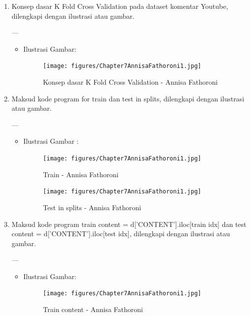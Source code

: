 {\begin{enumerate}
\begin{itemize}
\end{itemize}

\item Konsep dasar K Fold Cross Validation pada dataset komentar Youtube, dilengkapi dengan ilustrasi atau gambar.

---

\begin{itemize}
\item Ilustrasi Gambar:

\begin{figure}[!hbtp]
\centering
\texttt{[image: figures/Chapter7AnnisaFathoroni1.jpg]}
\caption{Konsep dasar K Fold Cross Validation - Annisa Fathoroni}
\label{Konsep dasar K Fold Cross Validation - Annisa Fathoroni}
\end{figure}

\end{itemize}

\item Maksud kode program for train dan test in splits, dilengkapi dengan ilustrasi atau gambar.

---

\begin{itemize}
\item Ilustrasi Gambar :

\begin{figure}[!hbtp]
\centering
\texttt{[image: figures/Chapter7AnnisaFathoroni1.jpg]}
\caption{Train - Annisa Fathoroni}
\label{Train - Annisa Fathoroni}
\end{figure}

\begin{figure}[!hbtp]
\centering
\texttt{[image: figures/Chapter7AnnisaFathoroni1.jpg]}
\caption{Test in splits - Annisa Fathoroni}
\label{Test in splits - Annisa Fathoroni}
\end{figure}

\end{itemize}

\item Maksud kode program train content = d[’CONTENT’].iloc[train idx] dan test content = d[’CONTENT’].iloc[test idx], dilengkapi dengan ilustrasi atau gambar.

---

\begin{itemize}
\item Ilustrasi Gambar:

\begin{figure}[!hbtp]
\centering
\texttt{[image: figures/Chapter7AnnisaFathoroni1.jpg]}
\caption{Train content - Annisa Fathoroni}
\label{Train content - Annisa Fathoroni}
\end{figure}


\end{itemize}
\end{enumerate}}
